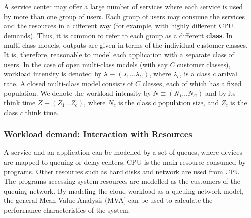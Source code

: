 A service center may offer a large number of services where each service is used by more than one group of users. Each group of users may consume the services and the resources in a different way (for example, with highly different CPU demands). Thus, it is common to refer to each group as a different \textbf{class}. In multi-class models, outputs are given in terms of the individual customer classes. It is, therefore, reasonable to model each application with a separate class
of users. In the case of open multi-class models (with say $C$ customer classes), workload intensity is denoted by $\lambda\equiv(\lambda_1 \dots \lambda_C)$, where $\lambda_c$, is a class $c$ arrival rate. A closed multi-class model consists of $C$ classes, each of which has a fixed population. We denote the workload intensity by $N\equiv(N_1 \dots N_C)$ and by its think time $Z\equiv(Z_1\dots Z_c)$, where $N_c$ is the class $c$ population size, and $Z_c$ is the class $c$ think time. 

 \subsubsection{Workload demand: Interaction with Resources}  
 \label{sec:workload-demands-background}  
 A service and an application can be modelled by a set of queues, where devices are mapped to queuing or delay centers. CPU is the main resource consumed by programs.  Other resources such as hard disks and network are used from CPU. The programs accessing system resources are modelled as the customers of the queuing network. By modeling the cloud workload as a queuing network model, the general Mean Value Analysis (MVA) can be used to calculate the performance characteristics of the system. 
 
